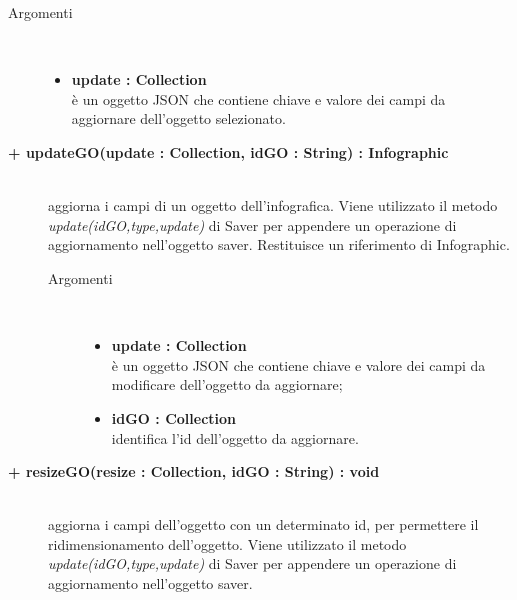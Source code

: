 \begin{description}
\begin{description}
\begin{description}
			\item[Argomenti] \hfill \\
				\begin{itemize}
						\item \textbf{update : Collection			} \hfill \\
					è un oggetto JSON che contiene chiave e valore dei campi da aggiornare dell'oggetto selezionato.
				\end{itemize}

\end{description}

\end{description}

\begin{description}
		\item[\textbf{\color{blue}+ updateGO(update : Collection, idGO : String) : Infographic			}] \hfill \\
			aggiorna i campi di un oggetto dell'infografica. Viene utilizzato il metodo \textit{update(idGO,type,update)} di Saver per appendere un operazione di aggiornamento nell'oggetto saver. Restituisce un riferimento di Infographic.   

\begin{description}
			\item[Argomenti] \hfill \\
				\begin{itemize}
						\item \textbf{update : Collection			} \hfill \\
					è un oggetto JSON che contiene chiave e valore dei campi da modificare dell'oggetto da aggiornare;
					\item \textbf{idGO : Collection			} \hfill \\
					identifica l'id dell'oggetto da aggiornare.
				\end{itemize}

\end{description}

\end{description}

\begin{description}
		\item[\textbf{\color{blue}+ resizeGO(resize : Collection, idGO : String) : void			}] \hfill \\
			aggiorna i campi dell'oggetto con un determinato id, per permettere il ridimensionamento dell'oggetto. Viene utilizzato il metodo \textit{update(idGO,type,update)} di Saver per appendere un operazione di aggiornamento nell'oggetto saver.     


\end{description}
\end{description}
